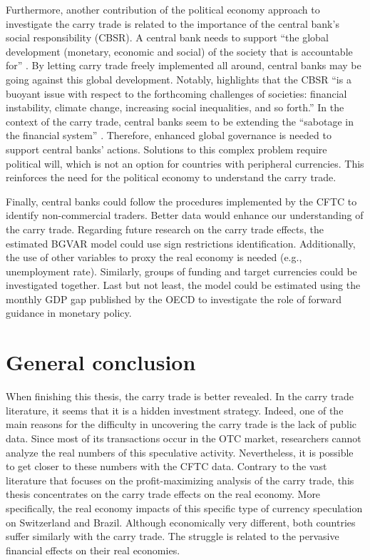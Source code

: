 \documentclass[a4paper, twoside]{templates/ociamthesis}
\begin{document}
Furthermore, another contribution of the political economy approach to investigate the carry trade is related to the importance of the central bank's social responsibility (CBSR). A central bank needs to support ``the global development (monetary, economic and social) of the society that is accountable for'' \autocite[ 164]{vallet2020}. By letting carry trade freely implemented all around, central banks may be going against this global development. Notably, \textcite[ 35]{vallet2021} highlights that the CBSR ``is a buoyant issue with respect to the forthcoming challenges of societies: financial instability, climate change, increasing social inequalities, and so forth.'' In the context of the carry trade, central banks seem to be extending the ``sabotage in the financial system'' \autocite{nesvetailova2020}. Therefore, enhanced global governance is needed to support central banks' actions. Solutions to this complex problem require political will, which is not an option for countries with peripheral currencies. This reinforces the need for the political economy to understand the carry trade.

Finally, central banks could follow the procedures implemented by the CFTC to identify non-commercial traders. Better data would enhance our understanding of the carry trade. Regarding future research on the carry trade effects, the estimated BGVAR model could use sign restrictions identification. Additionally, the use of other variables to proxy the real economy is needed (e.g., unemployment rate). Similarly, groups of funding and target currencies could be investigated together. Last but not least, the model could be estimated using the monthly GDP gap published by the OECD to investigate the role of forward guidance in monetary policy.

\hypertarget{general-conclusion}{%
\chapter*{General conclusion}\label{general-conclusion}}

When finishing this thesis, the carry trade is better revealed. In the carry trade literature, it seems that it is a hidden investment strategy. Indeed, one of the main reasons for the difficulty in uncovering the carry trade is the lack of public data. Since most of its transactions occur in the OTC market, researchers cannot analyze the real numbers of this speculative activity. Nevertheless, it is possible to get closer to these numbers with the CFTC data. Contrary to the vast literature that focuses on the profit-maximizing analysis of the carry trade, this thesis concentrates on the carry trade effects on the real economy. More specifically, the real economy impacts of this specific type of currency speculation on Switzerland and Brazil. Although economically very different, both countries suffer similarly with the carry trade. The struggle is related to the pervasive financial effects on their real economies.
\end{document}
